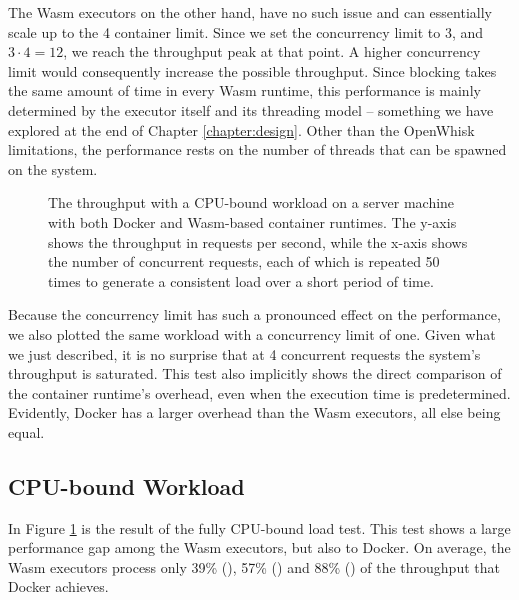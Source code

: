 The Wasm executors on the other hand, have no such issue and can essentially scale up to the 4 container limit. Since we set the concurrency limit to 3, and $3 \cdot 4 = 12$, we reach the throughput peak at that point. A higher concurrency limit would consequently increase the possible throughput. Since blocking takes the same amount of time in every Wasm runtime, this performance is mainly determined by the executor itself and its threading model -- something we have explored at the end of Chapter \ref{chapter:design}. Other than the OpenWhisk limitations, the performance rests on the number of threads that can be spawned on the system.

\begin{figure}
    \begin{center}
        
    \end{center}
    \caption{The throughput with a CPU-bound workload on a server machine with both Docker and Wasm-based container runtimes. The y-axis shows the throughput in requests per second, while the x-axis shows the number of concurrent requests, each of which is repeated 50 times to generate a consistent load over a short period of time.}
    \label{fig:pc-load-hash}
\end{figure}

Because the concurrency limit has such a pronounced effect on the performance, we also plotted the same workload with a concurrency limit of one. Given what we just described, it is no surprise that at 4 concurrent requests the system's throughput is saturated. This test also implicitly shows the direct comparison of the container runtime's overhead, even when the execution time is predetermined. Evidently, Docker has a larger overhead than the Wasm executors, all else being equal.


\subsection{CPU-bound Workload}

In Figure \ref{fig:pc-load-hash} is the result of the fully CPU-bound load test. This test shows a large performance gap among the Wasm executors, but also to Docker. On average, the Wasm executors process only 39\% (), 57\% () and 88\% () of the throughput that Docker achieves.

